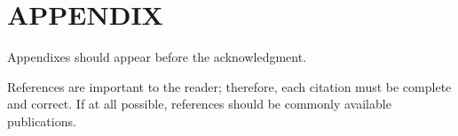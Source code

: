 \documentclass[conference]{IEEEtran}
\begin{document}






\section*{APPENDIX}

Appendixes should appear before the acknowledgment.



References are important to the reader; therefore, each citation must be complete and correct. If at all possible, references should be commonly available publications.
\end{document}
